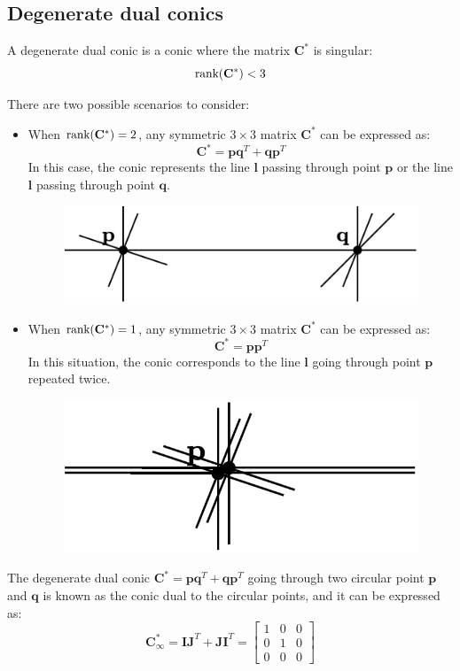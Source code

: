 \subsection{Degenerate dual conics}
\begin{definition}
    A degenerate dual conic is a conic where the matrix $\mathbf{C}^\ast$ is singular: 
    \[\textnormal{rank}(\mathbf{C}^\ast) < 3\]
\end{definition}
There are two possible scenarios to consider:
\begin{itemize}
    \item When $\textnormal{rank}(\mathbf{C}^\ast) = 2$, any symmetric $3 \times 3$ matrix $\mathbf{C}^\ast$ can be expressed as:
        \[\mathbf{C}^\ast=\mathbf{pq}^T+\mathbf{qp}^T\]
        In this case, the conic represents the line $\mathbf{l}$ passing through point $\mathbf{p}$ or the line $\mathbf{l}$ passing through point $\mathbf{q}$.
        \begin{figure}[H]
            \centering
            \includegraphics[width=0.35\linewidth]{images/deg2.png}
        \end{figure}
    \item When $\textnormal{rank}(\mathbf{C}^\ast) = 1$, any symmetric $3 \times 3$ matrix $\mathbf{C}^\ast$ can be expressed as:
        \[\mathbf{C}^\ast=\mathbf{pp}^T\]
        In this situation, the conic corresponds to the line $\mathbf{l}$ going through point $\mathbf{p}$ repeated twice. 
        \begin{figure}[H]
            \centering
            \includegraphics[width=0.4\linewidth]{images/deg1.png}
        \end{figure}
\end{itemize}

\begin{definition}
    The degenerate dual conic $\mathbf{C}^\ast=\mathbf{pq}^T+\mathbf{qp}^T$ going through two circular point $\mathbf{p}$ and $\mathbf{q}$ is known as the conic dual to the circular points, and it can be expressed as:
    \[\mathbf{C}^\ast_{\infty}=\mathbf{IJ}^{T}+\mathbf{JI}^{T}=
    \begin{bmatrix}
        1 & 0 & 0 \\
        0 & 1 & 0 \\
        0 & 0 & 0 
    \end{bmatrix}\]
\end{definition}